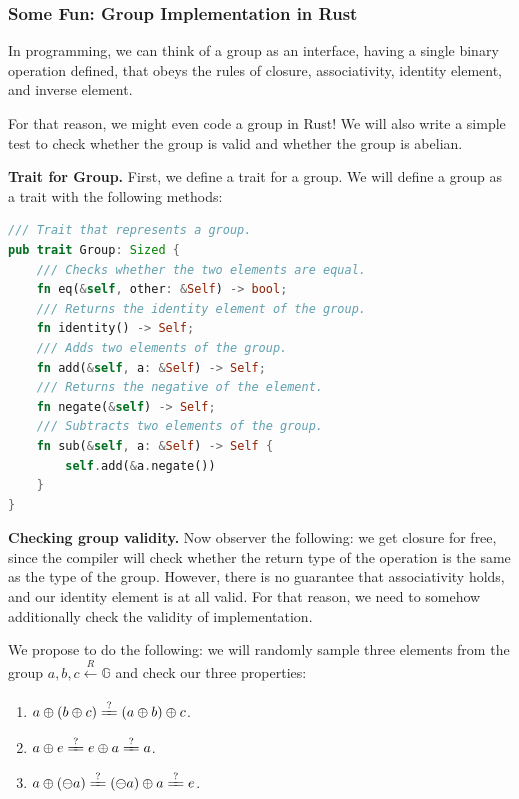 \documentclass[../lecture-notes.tex]{subfiles}
\begin{document}
\pagebreak

\subsubsection{Some Fun: Group Implementation in Rust}

In programming, we can think of a group as an interface, having a single binary operation defined, that obeys the rules of closure, associativity, identity element, and inverse element.

For that reason, we might even code a group in Rust! We will also write a simple test to check whether the group is valid and whether the group is abelian.

\textbf{Trait for Group.} First, we define a trait for a group. We will define a group as a trait with the following methods:
\begin{lstlisting}[language=Rust]
/// Trait that represents a group.
pub trait Group: Sized {
    /// Checks whether the two elements are equal.
    fn eq(&self, other: &Self) -> bool;
    /// Returns the identity element of the group.
    fn identity() -> Self;
    /// Adds two elements of the group.
    fn add(&self, a: &Self) -> Self;
    /// Returns the negative of the element.
    fn negate(&self) -> Self;
    /// Subtracts two elements of the group.
    fn sub(&self, a: &Self) -> Self {
        self.add(&a.negate())
    }
}
\end{lstlisting}

\textbf{Checking group validity.} Now observer the following: we get closure for free, since the compiler will check whether the return type of the operation is the same as the type of the group. 
However, there is no guarantee that associativity holds, and our identity element is at all valid. For that reason, we need to somehow additionally check the
validity of implementation.

We propose to do the following: we will randomly sample three elements from the group $a,b,c \xleftarrow[]{R} \mathbb{G}$ and check our three properties:
\begin{enumerate}
    \item $a \oplus (b \oplus c) \xlongequal{?} (a \oplus b) \oplus c$.
    \item $a \oplus e \xlongequal{?} e \oplus a \xlongequal{?} a $.
    \item $a \oplus (\ominus a) \xlongequal{?} (\ominus a) \oplus a \xlongequal{?} e$.
\end{enumerate}
\end{document}
